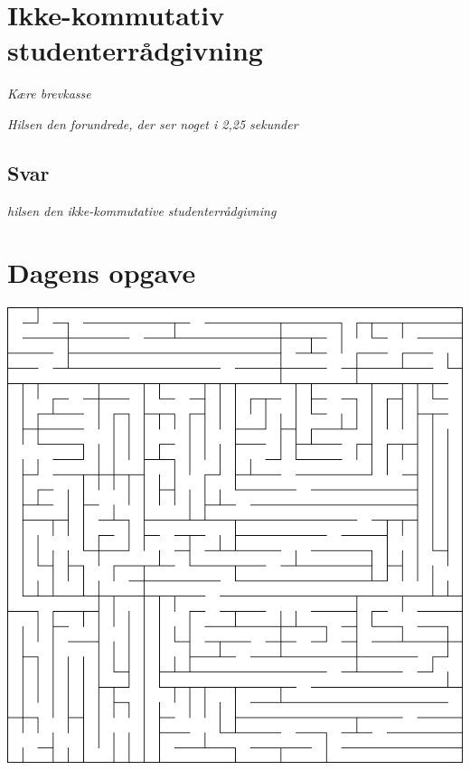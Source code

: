 \begin{minipage}[t]{170mm}
\vspace{3mm}
\section*{Ikke-kommutativ studenterrådgivning}
\emph{Kære brevkasse}


\emph{Hilsen den forundrede, der ser noget i 2,25 sekunder}

\subsection*{Svar}

{\flushright\emph{hilsen den ikke-kommutative studenterrådgivning}}
\vspace{3mm}
\section*{Dagens opgave}

\includegraphics[width=\textwidth]{maze.png}


\end{minipage}
